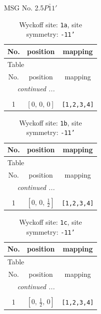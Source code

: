 \documentclass[fleqn,8pt]{jsarticle}
\begin{document}
\setcounter{MaxMatrixCols}{32}

\renewcommand{\tablename}{Table~}
\renewcommand{\figurename}{Figure~}
\begin{center}
\LARGE
MSG No. 2.5\quad$P\bar{1}1'$
\end{center}
\renewcommand{\arraystretch}{1.2}
\begin{longtable}{ccc}
\caption{Wyckoff site: {\tt 1a}, site symmetry: {\tt -11'}}
 \\
 \hline \hline
No. & position & mapping \\ \hline \endfirsthead

\multicolumn{2}{l}{\tablename\ \thetable{}} \\
 \hline \hline
No. & position & mapping \\ \hline \endhead

 \hline \hline
\multicolumn{2}{r}{\footnotesize\it continued ...} \\ \endfoot

 \hline \hline
\multicolumn{2}{r}{} \\ \endlastfoot

1 & $\left[ 0,\, 0,\, 0 \right]$ & {\tt [1,2,3,4]} \\
\end{longtable}
\renewcommand{\arraystretch}{1.2}
\begin{longtable}{ccc}
\caption{Wyckoff site: {\tt 1b}, site symmetry: {\tt -11'}}
 \\
 \hline \hline
No. & position & mapping \\ \hline \endfirsthead

\multicolumn{2}{l}{\tablename\ \thetable{}} \\
 \hline \hline
No. & position & mapping \\ \hline \endhead

 \hline \hline
\multicolumn{2}{r}{\footnotesize\it continued ...} \\ \endfoot

 \hline \hline
\multicolumn{2}{r}{} \\ \endlastfoot

1 & $\left[ 0,\, 0,\, \frac{1}{2} \right]$ & {\tt [1,2,3,4]} \\
\end{longtable}
\renewcommand{\arraystretch}{1.2}
\begin{longtable}{ccc}
\caption{Wyckoff site: {\tt 1c}, site symmetry: {\tt -11'}}
 \\
 \hline \hline
No. & position & mapping \\ \hline \endfirsthead

\multicolumn{2}{l}{\tablename\ \thetable{}} \\
 \hline \hline
No. & position & mapping \\ \hline \endhead

 \hline \hline
\multicolumn{2}{r}{\footnotesize\it continued ...} \\ \endfoot

 \hline \hline
\multicolumn{2}{r}{} \\ \endlastfoot

1 & $\left[ 0,\, \frac{1}{2},\, 0 \right]$ & {\tt [1,2,3,4]} \\
\end{longtable}
\end{document}
